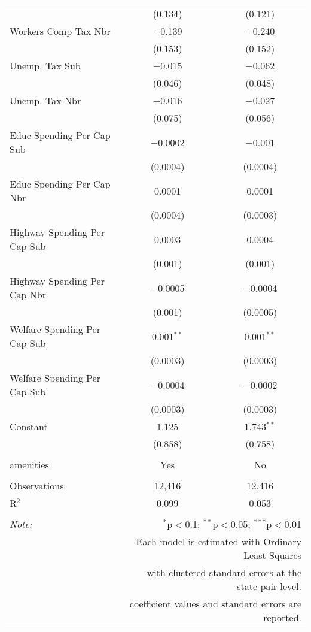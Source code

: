 \begin{table}[!htbp]
\begin{tabular}{@{\extracolsep{5pt}}lcc}
  & (0.134) & (0.121) \\ 
  Workers Comp Tax Nbr & $-$0.139 & $-$0.240 \\ 
  & (0.153) & (0.152) \\ 
  Unemp. Tax Sub & $-$0.015 & $-$0.062 \\ 
  & (0.046) & (0.048) \\ 
  Unemp. Tax Nbr & $-$0.016 & $-$0.027 \\ 
  & (0.075) & (0.056) \\ 
  Educ Spending Per Cap Sub & $-$0.0002 & $-$0.001 \\ 
  & (0.0004) & (0.0004) \\ 
  Educ Spending Per Cap Nbr & 0.0001 & 0.0001 \\ 
  & (0.0004) & (0.0003) \\ 
  Highway Spending Per Cap Sub & 0.0003 & 0.0004 \\ 
  & (0.001) & (0.001) \\ 
  Highway Spending Per Cap Nbr & $-$0.0005 & $-$0.0004 \\ 
  & (0.001) & (0.0005) \\ 
  Welfare Spending Per Cap Sub & 0.001$^{**}$ & 0.001$^{**}$ \\ 
  & (0.0003) & (0.0003) \\ 
  Welfare Spending Per Cap Sub & $-$0.0004 & $-$0.0002 \\ 
  & (0.0003) & (0.0003) \\ 
  Constant & 1.125 & 1.743$^{**}$ \\ 
  & (0.858) & (0.758) \\ 
 \hline \\[-1.8ex] 
amenities & Yes & No \\ 
\hline \\[-1.8ex] 
Observations & 12,416 & 12,416 \\ 
R$^{2}$ & 0.099 & 0.053 \\ 
\hline 
\hline \\[-1.8ex] 
\textit{Note:}  & \multicolumn{2}{r}{$^{*}$p$<$0.1; $^{**}$p$<$0.05; $^{***}$p$<$0.01} \\ 
 & \multicolumn{2}{r}{Each model is estimated with Ordinary Least Squares} \\ 
 & \multicolumn{2}{r}{with clustered standard errors at the state-pair level.} \\ 
 & \multicolumn{2}{r}{coefficient values and standard errors are reported.} \\ 
\end{tabular} 
\end{table} 
